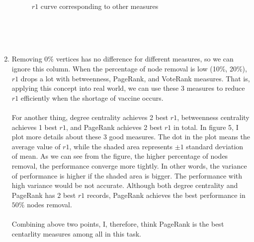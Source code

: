 \documentclass[12pt]{article}
\begin{document}
\begin{enumerate}[label=(\alph*)]
\begin{figure}[htbp]
{				\label{r1_other_box}
			}
			\caption{$r1$ curve corresponding to other measures}
		\end{figure}
	\\ \\ \\
	\item Removing $0\%$ vertices has no difference for different measures, so we can ignore this column. When the percentage of node removal is low (10\%, 20\%), $r1$ drops a lot with betweenness, PageRank, and VoteRank measures. That is, applying this concept into real world, we can use these 3 measures to reduce $r1$ efficiently when the shortage of vaccine occurs.\\ \\
	For another thing, degree centrality achieves 2 best $r1$, betweenness centrality achieves 1 best $r1$, and PageRank achieves 2 best $r1$ in total. In figure 5, I plot more details about these 3 good measures. The dot in the plot means the average value of $r1$, while the shaded area represents $\pm 1$ standard deviation of mean. As we can see from the figure, the higher percentage of nodes removal, the performance converge more tightly. In other words, the variance of performance is higher if the shaded area is bigger. The performance with high variance would be not accurate. Although both degree centrality and PageRank has 2 best $r1$ records, PageRank achieves the best performance in $50\%$ nodes removal. \\ \\
	Combining above two points, I, therefore, think PageRank is the best centarlity measures among all in this task.
		\begin{figure}[htbp]
			\centering
			\quad
\end{figure}
\end{enumerate}
\end{document}

